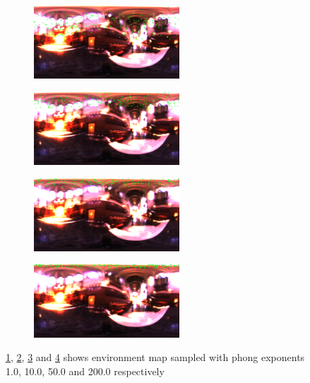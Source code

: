 \documentclass[fleqn, hidelinks]{article} %
\begin{document}
\begin{figure}
        \centering
        \begin{subfigure}[b]{\textwidth}
                \centering
                \includegraphics[width=0.6\textwidth]{imgs/Part3/env1.png}
                \caption{}
                \label{fig:env1}
        \end{subfigure}
        \begin{subfigure}[b]{\textwidth}
                \centering
                \includegraphics[width=0.6\textwidth]{imgs/Part3/env10.png}
                \caption{}
                \label{fig:env10}
        \end{subfigure}
        \begin{subfigure}[b]{\textwidth}
                \centering
                \includegraphics[width=0.6\textwidth]{imgs/Part3/env50.png}
                \caption{}
                \label{fig:env50}
        \end{subfigure}
        \begin{subfigure}[b]{\textwidth}
                \centering
                \includegraphics[width=0.6\textwidth]{imgs/Part3/env200.png}
                \caption{}
                \label{fig:env200}
        \end{subfigure}        
        \caption{\ref{fig:env1}, \ref{fig:env10}, \ref{fig:env50} and \ref{fig:env200} shows environment map sampled with phong exponents 1.0, 10.0, 50.0 and 200.0 respectively}\label{fig:PhongSampling}
\end{figure}
\end{document}
